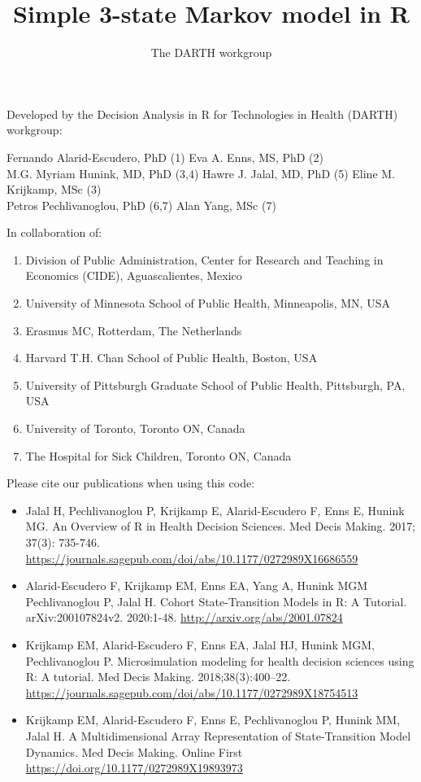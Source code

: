 \documentclass[
]{article}
\title{Simple 3-state Markov model in R}
\author{The DARTH workgroup}
\date{}
\providecommand{\tightlist}{%
  \setlength{\itemsep}{0pt}\setlength{\parskip}{0pt}}
\begin{document}
\maketitle

Developed by the Decision Analysis in R for Technologies in Health
(DARTH) workgroup:

Fernando Alarid-Escudero, PhD (1) Eva A. Enns, MS, PhD (2)\\
M.G. Myriam Hunink, MD, PhD (3,4) Hawre J. Jalal, MD, PhD (5) Eline M.
Krijkamp, MSc (3)\\
Petros Pechlivanoglou, PhD (6,7) Alan Yang, MSc (7)

In collaboration of:

\begin{enumerate}
\def\labelenumi{\arabic{enumi}.}
\tightlist
\item
  Division of Public Administration, Center for Research and Teaching in
  Economics (CIDE), Aguascalientes, Mexico
\item
  University of Minnesota School of Public Health, Minneapolis, MN, USA
\item
  Erasmus MC, Rotterdam, The Netherlands
\item
  Harvard T.H. Chan School of Public Health, Boston, USA
\item
  University of Pittsburgh Graduate School of Public Health, Pittsburgh,
  PA, USA
\item
  University of Toronto, Toronto ON, Canada
\item
  The Hospital for Sick Children, Toronto ON, Canada
\end{enumerate}

Please cite our publications when using this code:

\begin{itemize}
\item
  Jalal H, Pechlivanoglou P, Krijkamp E, Alarid-Escudero F, Enns E,
  Hunink MG. An Overview of R in Health Decision Sciences. Med Decis
  Making. 2017; 37(3): 735-746.
  \url{https://journals.sagepub.com/doi/abs/10.1177/0272989X16686559}
\item
  Alarid-Escudero F, Krijkamp EM, Enns EA, Yang A, Hunink MGM
  Pechlivanoglou P, Jalal H. Cohort State-Transition Models in R: A
  Tutorial. arXiv:200107824v2. 2020:1-48.
  \url{http://arxiv.org/abs/2001.07824}
\item
  Krijkamp EM, Alarid-Escudero F, Enns EA, Jalal HJ, Hunink MGM,
  Pechlivanoglou P. Microsimulation modeling for health decision
  sciences using R: A tutorial. Med Decis Making. 2018;38(3):400--22.
  \url{https://journals.sagepub.com/doi/abs/10.1177/0272989X18754513}
\item
  Krijkamp EM, Alarid-Escudero F, Enns E, Pechlivanoglou P, Hunink MM,
  Jalal H. A Multidimensional Array Representation of State-Transition
  Model Dynamics. Med Decis Making. Online First
  \url{https://doi.org/10.1177/0272989X19893973}
\end{itemize}
\end{document}
